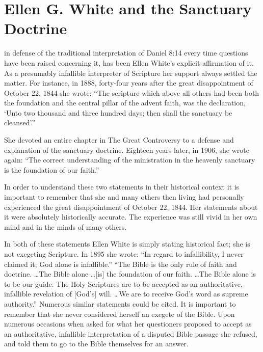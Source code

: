 \chapter{Ellen G. White and the Sanctuary Doctrine}
\label{ch:egw}

 in defense of the traditional interpretation of Daniel
8:14 every time questions have been raised concerning it, has been Ellen
White's explicit affirmation of it. As a presumably infallible interpreter
of Scripture her support always settled the matter. For instance, in 1888,
forty-four years after the great disappointment of October 22, 1844 she
wrote: ``The scripture which above all others had been both the foundation
and the central pillar of the advent faith, was the declaration, `Unto two
thousand and three hundred days; then shall the sanctuary be cleansed'.''\cite{8}

She devoted an entire chapter in The Great Controversy to a defense and
explanation of the sanctuary doctrine.\cite{9}
 Eighteen years later, in 1906, she
 wrote again: ``The correct understanding of the ministration in the heavenly
 sanctuary is the foundation of our faith.''\cite{10}

In order to understand these two statements in their historical context it
is important to remember that she and many others then living had personally
experienced the great disappointment of October 22, 1844. Her statements
about it were absolutely historically accurate. The experience was still
vivid in her own mind and in the minds of many others. 

\newpage
In both of these statements Ellen White is simply stating historical fact;
she is not exegeting Scripture. In 1895 she wrote: ``In regard to
infallibility, I never claimed it; God alone is infallible.''\cite{11} ``The Bible is
the only rule of faith and doctrine. \ldots The Bible alone \ldots [is] the
foundation of our faith. \ldots The Bible alone is to be our guide. The Holy
Scriptures are to be accepted as an authoritative, infallible revelation of
[God's] will. \ldots We are to receive God's word as supreme authority.''
\cite{12, 12a, 12b, 12c, 12d, 12e, 12f, 12g}
Numerous similar statements could be cited.\cite{13a, 13b} It is important to remember
that she never considered herself an exegete of the Bible. Upon numerous
occasions when asked for what her questioners proposed to accept as an
authoritative, infallible interpretation of a disputed Bible passage she
refused, and told them to go to the Bible themselves for an answer. 


